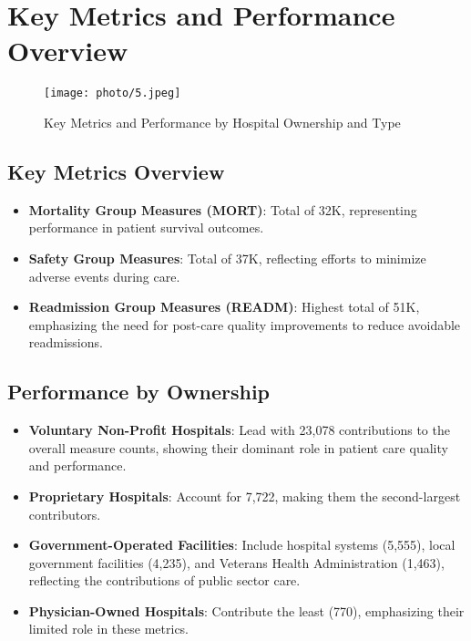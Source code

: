 \section{Key Metrics and Performance Overview}

\begin{figure}[ht]
    \centering
    \texttt{[image: photo/5.jpeg]} %
    \caption{Key Metrics and Performance by Hospital Ownership and Type}
    \label{fig:key_metrics_performance}
\end{figure}

\subsection{Key Metrics Overview}
\begin{itemize}
    \item \textbf{Mortality Group Measures (MORT)}: Total of 32K, representing performance in patient survival outcomes.
    \item \textbf{Safety Group Measures}: Total of 37K, reflecting efforts to minimize adverse events during care.
    \item \textbf{Readmission Group Measures (READM)}: Highest total of 51K, emphasizing the need for post-care quality improvements to reduce avoidable readmissions.
\end{itemize}

\subsection{Performance by Ownership}
\begin{itemize}
    \item \textbf{Voluntary Non-Profit Hospitals}: Lead with 23,078 contributions to the overall measure counts, showing their dominant role in patient care quality and performance.
    \item \textbf{Proprietary Hospitals}: Account for 7,722, making them the second-largest contributors.
    \item \textbf{Government-Operated Facilities}: Include hospital systems (5,555), local government facilities (4,235), and Veterans Health Administration (1,463), reflecting the contributions of public sector care.
    \item \textbf{Physician-Owned Hospitals}: Contribute the least (770), emphasizing their limited role in these metrics.
\end{itemize}

